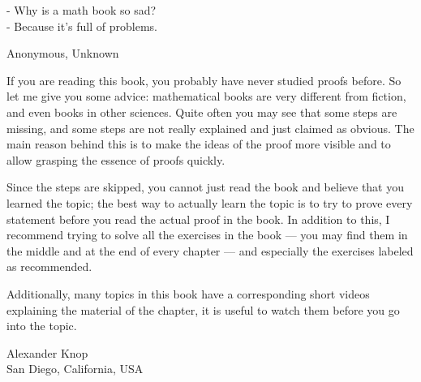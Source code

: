 \epigraph{
    - Why is a math book so sad? \\
    - Because it's full of problems.
}{Anonymous, Unknown}


If you are reading this book, you probably have never studied proofs before.
So let me give you some advice: mathematical books are very different from
fiction, and even books in other sciences. Quite often you may see that some
steps are missing, and some steps are not really explained and just claimed as
obvious. The main reason behind this is to make the ideas of the proof more
visible and to allow grasping the essence of proofs quickly.

Since the steps are skipped, you cannot just read the book and believe that you
learned the topic; the best way to actually learn the topic is to try to prove
every statement before you read the actual proof in the book. In addition to
this, I recommend trying to solve all the exercises in the book --- you may find
them in the middle and at the end of every chapter --- and especially the
exercises labeled as recommended.

Additionally, many topics in this book have a corresponding short videos
explaining the material of the chapter, it is useful to watch them before you go
into the topic.

\begin{flushright}
  Alexander Knop \\
  San Diego, California, USA
\end{flushright}
